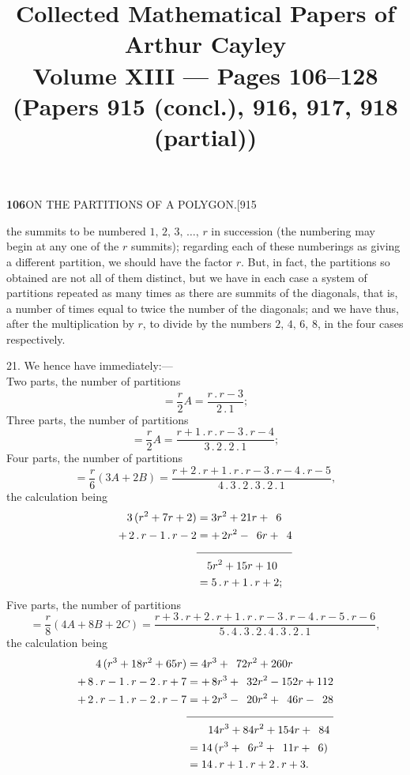 \documentclass[11pt]{article}
\title{Collected Mathematical Papers of Arthur Cayley\\
Volume XIII --- Pages 106--128\\
(Papers 915 (concl.), 916, 917, 918 (partial))}
\author{}
\date{}
\begin{document}
\maketitle


\noindent\textbf{106}\hfill ON THE PARTITIONS OF A POLYGON.\hfill[915

\smallskip
the summits to be numbered $1,\,2,\,3,\,\ldots,\,r$ in succession (the
numbering may begin at any one of the $r$ summits); regarding each of these
numberings as giving a different partition, we should have the factor $r$.
But, in fact, the partitions so obtained are not all of them distinct, but
we have in each case a system of partitions repeated as many times as there
are summits of the diagonals, that is, a number of times equal to twice
the number of the diagonals; and we have thus, after the multiplication by
$r$, to divide by the numbers $2,\,4,\,6,\,8$, in the four cases
respectively.

\hspace{1em} 21. We hence have immediately:---\\
Two parts, the number of partitions
\[
=\frac{r}{2}A=\frac{r\,.\,r-3}{2\,.\,1};
\]
Three parts, the number of partitions
\[
=\frac{r}{2}A=\frac{r+1\,.\,r\,.\,r-3\,.\,r-4}{3\,.\,2\,.\,2\,.\,1};
\]
Four parts, the number of partitions
\[
=\frac{r}{6}(3A+2B)=\frac{r+2\,.\,r+1\,.\,r\,.\,r-3\,.\,r-4\,.\,r-5}{4\,.\,3\,.\,2\,.\,3\,.\,2\,.\,1},
\]
the calculation being
\begin{align*}
3\,(r^{2}+7r+2) &= 3r^{2}+21r+\phantom{0}6\\
+\,2\,.\,r-1\,.\,r-2 &= +\,2r^{2}-\phantom{0}6r+\phantom{0}4\\[-2pt]
\cline{2-2}
&\phantom{=\,}5r^{2}+15r+10\\
&=5\,.\,r+1\,.\,r+2;
\end{align*}
Five parts, the number of partitions
\[
=\frac{r}{8}(4A+8B+2C)=\frac{r+3\,.\,r+2\,.\,r+1\,.\,r\,.\,r-3\,.\,r-4\,.\,r-5\,.\,r-6}{5\,.\,4\,.\,3\,.\,2\,.\,4\,.\,3\,.\,2\,.\,1},
\]
the calculation being
\begin{align*}
4\,(r^{3}+18r^{2}+65r) &= 4r^{3}+\phantom{0}72r^{2}+260r\phantom{+0000}\\
+\,8\,.\,r-1\,.\,r-2\,.\,r+7 &= +\,8r^{3}+\phantom{0}32r^{2}-152r+112\\
+\,2\,.\,r-1\,.\,r-2\,.\,r-7 &= +\,2r^{3}-\phantom{0}20r^{2}+\phantom{0}46r-\phantom{0}28\\[-2pt]
\cline{2-2}
&\phantom{=\,}\phantom{00}14r^{3}+84r^{2}+154r+\phantom{0}84\\
&= 14\,(r^{3}+\phantom{0}6r^{2}+\phantom{0}11r+\phantom{0}6)\\
&= 14\,.\,r+1\,.\,r+2\,.\,r+3.
\end{align*}
\end{document}
